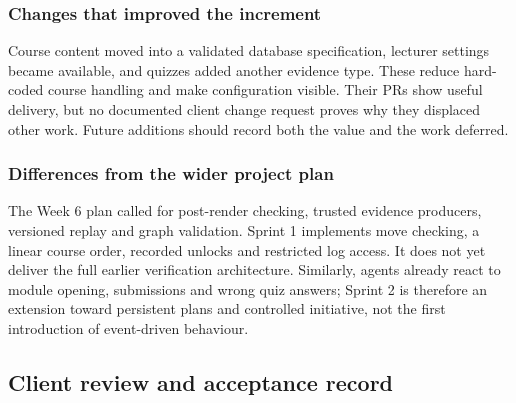 \documentclass[11pt,a4paper]{article}
\begin{document}
\subsubsection{Changes that improved the increment}
Course content moved into a validated database specification, lecturer settings became available, and quizzes added another evidence type. These reduce hard-coded course handling and make configuration visible. Their PRs show useful delivery, but no documented client change request proves why they displaced other work. Future additions should record both the value and the work deferred.

\subsubsection{Differences from the wider project plan}
The Week 6 plan called for post-render checking, trusted evidence producers, versioned replay and graph validation. Sprint 1 implements move checking, a linear course order, recorded unlocks and restricted log access. It does not yet deliver the full earlier verification architecture. Similarly, agents already react to module opening, submissions and wrong quiz answers; Sprint 2 is therefore an extension toward persistent plans and controlled initiative, not the first introduction of event-driven behaviour.

\subsection{Client review and acceptance record}
\end{document}
